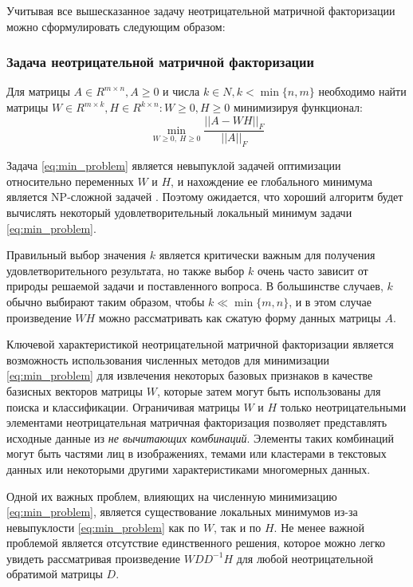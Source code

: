 \newpage

Учитывая все вышесказанное задачу неотрицательной матричной факторизации можно сформулировать следующим образом:

\subsubsection{Задача неотрицательной матричной факторизации}

Для матрицы $A \in R^{m \times n}, A \geq 0$ и числа $k \in N, k < \min\{n, m\}$
необходимо найти матрицы $W \in R^{m \times k}, H \in R^{k \times n} : W \geq 0, H \geq 0$ минимизируя функционал:
\begin{equation} \label{eq:min_problem}
  \min_{W \geq 0, \ H \geq 0} \dfrac{||A - WH||_F}{|| A ||_F}
\end{equation}

Задача \eqref{eq:min_problem} является невыпуклой задачей оптимизации относительно переменных $W$ и $H$,
и нахождение ее глобального минимума является NP-сложной задачей \cite{vavaris}.
Поэтому ожидается, что хороший алгоритм будет вычислять некоторый удовлетворительный локальный минимум задачи \eqref{eq:min_problem}.

Правильный выбор значения $k$ является критически важным для получения удовлетворительного результата,
но также выбор $k$ очень часто зависит от природы решаемой задачи и поставленного вопроса.
В большинстве случаев, $k$ обычно выбирают таким образом, чтобы $k \ll \min\{m, n\}$,
и в этом случае произведение $WH$ можно рассматривать как сжатую форму данных матрицы $A$.

Ключевой характеристикой неотрицательной матричной факторизации является возможность
использования численных методов для минимизации \eqref{eq:min_problem}
для извлечения некоторых базовых признаков в качестве базисных векторов матрицы $W​$,
которые затем могут быть использованы для поиска и классификации.
Ограничивая матрицы $W​$ и $H​$ только неотрицательными элементами
неотрицательная матричная факторизация позволяет представлять исходные данные из \textit{не вычитающих комбинаций}.
Элементы таких комбинаций могут быть частями лиц в изображениях, темами или кластерами в текстовых данных
или некоторыми другими характеристиками многомерных данных.

Одной их важных проблем, влияющих на численную минимизацию \eqref{eq:min_problem},
является существование локальных минимумов
из-за невыпуклости \eqref{eq:min_problem} как по $W$, так и по $H$.
Не менее важной проблемой является отсутствие единственного решения,
которое можно легко увидеть рассматривая произведение $WDD^{− 1}H$ для любой неотрицательной обратимой матрицы $D$.

